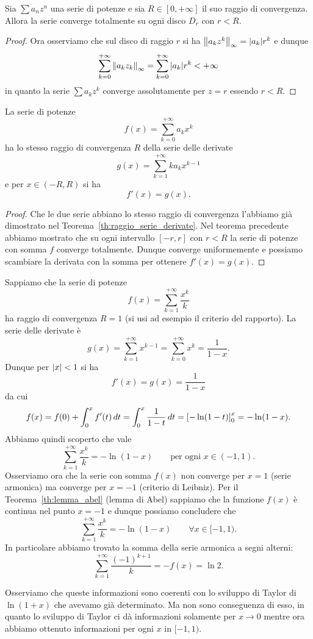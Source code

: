 \begin{theorem}
\label{th:convergenza_totale}
\mymark{***}%
Sia $\sum a_n z^n$ una serie di potenze e sia $R\in[0,+\infty]$ il suo raggio di convergenza. Allora la serie converge totalmente su ogni disco $D_r$ con $r<R$.
\end{theorem}
%
\begin{proof}
Ora osserviamo che sul disco di raggio $r$ si ha ${\left\Vert a_k z^k\right\Vert}_\infty = {\left|a_k\right|} r^k$ e dunque
\[
\sum_{k=0}^{+\infty} {\left\Vert a_k z_k\right\Vert}_\infty
= \sum_{k=0}^{+\infty} {\left|a_k\right|}r^k < +\infty
\]
in quanto la serie $\sum a_k z^k$ converge assolutamente per $z=r$ essendo $r<R$.
\end{proof}

\begin{corollary}
\label{cor:derivata_serie_potenze}
\mymark{**}
La serie di potenze
\[
  f(x) = \sum_{k=0}^{+\infty} a_k x^k
\]
ha lo stesso raggio di convergenza $R$ della serie delle derivate
\[
  g(x) = \sum_{k=1}^{+\infty} k a_k x^{k-1}
\]
e per $x\in (-R,R)$ si ha
\[
  f'(x) = g(x).
\]
\end{corollary}
%
\begin{proof}
Che le due serie abbiano lo stesso raggio di convergenza l'abbiamo già dimostrato nel Teorema~\ref{th:raggio_serie_derivate}. Nel teorema precedente abbiamo mostrato che su ogni intervallo $[-r,r]$ con $r<R$ la serie di potenze con somma $f$ converge totalmente. Dunque converge uniformemente e possiamo scambiare la derivata con la somma per ottenere $f'(x) = g(x)$.
\end{proof}

\begin{example}
Sappiamo che la serie di potenze
\[
f(x) = \sum_{k=1}^{+\infty} \frac{x^k}{k}
\]
ha raggio di convergenza $R=1$ (si usi ad esempio il criterio del rapporto). La serie delle derivate è
\[
 g(x) = \sum_{k=1}^{+\infty} x^{k-1} = \sum_{k=0}^{+\infty}x^k = \frac{1}{1-x}.
\]
Dunque per ${\left|x\right|}<1$ si ha
\[
  f'(x) = g(x) = \frac{1}{1-x}
\]
da cui
\[
 f(x) = f(0) + \int_0^x f'(t)\, dt = \int_0^x \frac{1}{1-t}\, dt
  = {\left[ -\ln(1-t) \right]}_0^x = -\ln(1-x).
\]
Abbiamo quindi scoperto che vale
\[
  \sum_{k=1}^{+\infty} \frac{x^k}{k} = - \ln (1-x) \qquad\text{per ogni $x\in (-1,1)$.}
\]
Osserviamo ora che la serie con somma $f(x)$
non converge per $x=1$ (serie armonica) ma
converge per $x=-1$ (criterio di Leibniz).
Per il Teorema~\ref{th:lemma_abel} (lemma di Abel)
sappiamo che la funzione $f(x)$ è continua nel punto $x=-1$ e dunque possiamo concludere che
\[
  \sum_{k=1}^{+\infty} \frac{x^k}{k} = -\ln(1-x)
  \qquad \forall x \in [-1,1).
\]
In particolare abbiamo trovato la somma della serie armonica a segni alterni:
\[
  \sum_{k=1}^{+\infty} \frac{(-1)^{k+1}}{k} = - f(x) = \ln 2.
\]

Osserviamo che queste informazioni sono coerenti con lo sviluppo di Taylor di $\ln(1+x)$ che avevamo già determinato. Ma non sono conseguenza di esso, in quanto lo sviluppo di Taylor ci dà informazioni solamente per $x\to 0$ mentre ora abbiamo ottenuto informazioni per ogni $x$ in $[-1,1)$.
 \end{example}

